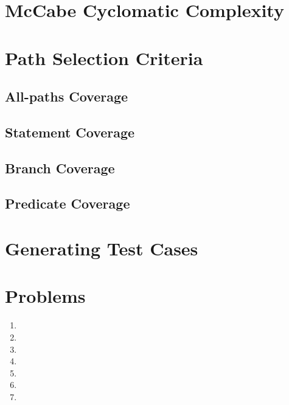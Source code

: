 \section{McCabe Cyclomatic Complexity}

\section{Path Selection Criteria}

\subsection{All-paths Coverage}

\subsection{Statement Coverage}

\subsection{Branch Coverage}

\subsection{Predicate Coverage}

\section{Generating Test Cases}

\section{Problems}
\begin{enumerate}
    \item 
    \item 
    \item 
    \item 
    \item 
    \item
    \item 
\end{enumerate}